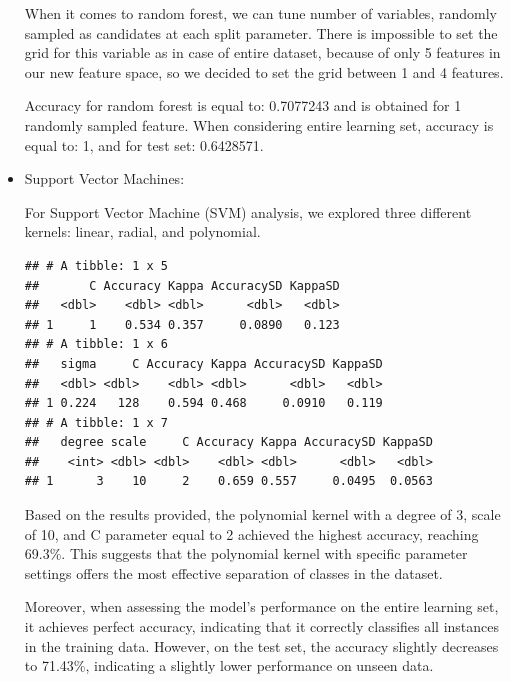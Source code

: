 \documentclass[11pt,a4paper]{article}\usepackage[]{graphicx}\usepackage[]{xcolor}
\makeatletter
\newenvironment{kframe}{%
 \def\at@end@of@kframe{}%
 \ifinner\ifhmode%
  \def\at@end@of@kframe{\end{minipage}}%
  \begin{minipage}{\columnwidth}%
 \fi\fi%
 \def\FrameCommand##1{\hskip\@totalleftmargin \hskip-\fboxsep
 \colorbox{shadecolor}{##1}\hskip-\fboxsep
     \hskip-\linewidth \hskip-\@totalleftmargin \hskip\columnwidth}%
 \MakeFramed {\advance\hsize-\width
   \@totalleftmargin\z@ \linewidth\hsize
   \@setminipage}}%
 {\par\unskip\endMakeFramed%
 \at@end@of@kframe}
\newenvironment{knitrout}{}{} %
\makeatother
\begin{document}
\begin{itemize}
	 	
	 	When it comes to random forest, we can tune number of variables, randomly sampled as candidates at each split parameter. There is impossible to set the grid for this variable as in case of entire dataset, because of only 5 features in our new feature space, so we decided to set the grid between 1 and 4 features.
	 	

	 	

	 	
	 	Accuracy for random forest is equal to: 0.7077243 and is obtained for 1 randomly sampled feature.\newline
	 	When considering entire learning set, accuracy is equal to: 1, and for test set: 0.6428571.
	 	
	 	\item Support Vector Machines:
	 	

	 	
	 	For Support Vector Machine (SVM) analysis, we explored three different kernels: linear, radial, and polynomial.
	 	
\begin{knitrout}
\color{fgcolor}\begin{kframe}
\begin{verbatim}
## # A tibble: 1 x 5
##       C Accuracy Kappa AccuracySD KappaSD
##   <dbl>    <dbl> <dbl>      <dbl>   <dbl>
## 1     1    0.534 0.357     0.0890   0.123
## # A tibble: 1 x 6
##   sigma     C Accuracy Kappa AccuracySD KappaSD
##   <dbl> <dbl>    <dbl> <dbl>      <dbl>   <dbl>
## 1 0.224   128    0.594 0.468     0.0910   0.119
## # A tibble: 1 x 7
##   degree scale     C Accuracy Kappa AccuracySD KappaSD
##    <int> <dbl> <dbl>    <dbl> <dbl>      <dbl>   <dbl>
## 1      3    10     2    0.659 0.557     0.0495  0.0563
\end{verbatim}
\end{kframe}
\end{knitrout}
	 	

	 	Based on the results provided, the polynomial kernel with a degree of 3, scale of 10, and C parameter equal to 2 achieved the highest accuracy, reaching 69.3\%. This suggests that the polynomial kernel with specific parameter settings offers the most effective separation of classes in the dataset.

Moreover, when assessing the model's performance on the entire learning set, it achieves perfect accuracy, indicating that it correctly classifies all instances in the training data. However, on the test set, the accuracy slightly decreases to 71.43\%, indicating a slightly lower performance on unseen data.


\end{itemize}
\end{document}
